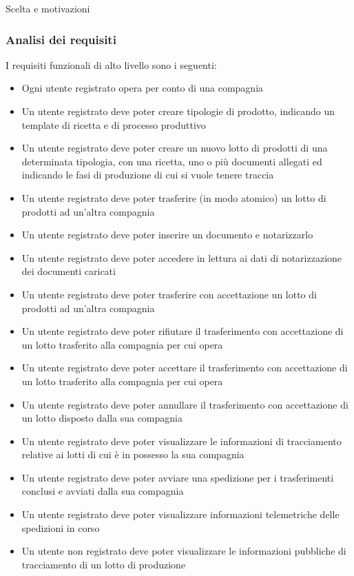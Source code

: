 \documentclass[a4paper,11pt]{article}
\begin{document}
Scelta e motivazioni

\subsubsection{Analisi dei requisiti}

I requisiti funzionali di alto livello sono i seguenti:

\begin{itemize}
  \item Ogni utente registrato opera per conto di una compagnia
  \item Un utente registrato deve poter creare tipologie di prodotto, indicando un template di ricetta e di processo produttivo
  \item Un utente registrato deve poter creare un nuovo lotto di prodotti di una determinata tipologia, con una ricetta, uno o più documenti allegati ed indicando le fasi di produzione di cui si vuole tenere traccia
  \item Un utente registrato deve poter trasferire (in modo atomico) un lotto di prodotti ad un'altra compagnia
  \item Un utente registrato deve poter inserire un documento e notarizzarlo
  \item Un utente registrato deve poter accedere in lettura ai dati di notarizzazione dei documenti caricati
  \item Un utente registrato deve poter trasferire con accettazione un lotto di prodotti ad un'altra compagnia
  \item Un utente registrato deve poter rifiutare il trasferimento con accettazione di un lotto trasferito alla compagnia per cui opera
  \item Un utente registrato deve poter accettare il trasferimento con accettazione di un lotto trasferito alla compagnia per cui opera
  \item Un utente registrato deve poter annullare il trasferimento con accettazione di un lotto disposto dalla sua compagnia
  \item Un utente registrato deve poter visualizzare le informazioni di tracciamento relative ai lotti di cui è in possesso la sua compagnia
  \item Un utente registrato deve poter avviare una spedizione per i trasferimenti conclusi e avviati dalla sua compagnia
  \item Un utente registrato deve poter visualizzare informazioni telemetriche delle spedizioni in corso
  \item Un utente non registrato deve poter visualizzare le informazioni pubbliche di tracciamento di un lotto di produzione
\end{itemize}
\end{document}
